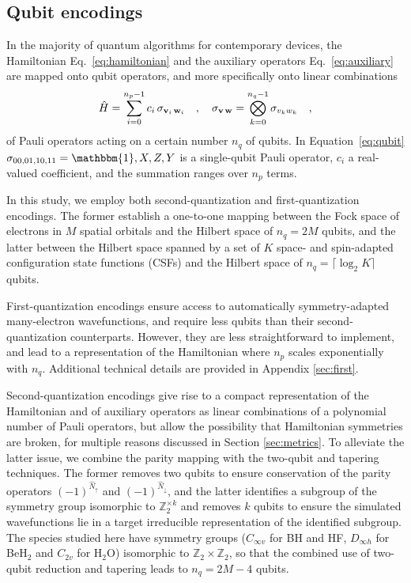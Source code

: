 \documentclass[aps,pra,twocolumn]{revtex4-2}
\newcommand{\vett}[1]{{\bf{#1}}}
\begin{document}
\subsection{Qubit encodings}

In the majority of quantum algorithms for contemporary devices, the Hamiltonian Eq.~\eqref{eq:hamiltonian} and the auxiliary operators Eq.~\eqref{eq:auxiliary} are mapped onto qubit operators,
and more specifically onto linear combinations 
\begin{equation}
\label{eq:qubit}
\hat{H} = \sum_{i=0}^{n_p-1} c_i \, \sigma_{\vett{v}_i \, \vett{w}_i} 
\quad,\quad
\sigma_{\vett{v} \, \vett{w}} = \bigotimes_{k=0}^{n_q-1} \sigma_{v_k w_k} 
\quad,
\end{equation}
of Pauli operators acting on a certain number $n_q$ of qubits. In Equation~\eqref{eq:qubit} $\sigma_{00,01,10,11} = \mathbbm{1},X,Z,Y$ is a single-qubit Pauli operator, 
$c_i$ a real-valued coefficient, and the summation ranges over $n_p$ terms.

In this study, we employ both second-quantization and first-quantization encodings.
The former establish a one-to-one mapping between the Fock space of electrons in $M$ spatial orbitals and the Hilbert space of $n_q = 2M$ qubits,
and the latter between the Hilbert space spanned by a set of $K$ space- and spin-adapted configuration state functions (CSFs) and the Hilbert space of $n_q = \lceil \log_2 K \rceil$ qubits.

First-quantization encodings ensure access to automatically symmetry-adapted many-electron wavefunctions, and require less qubits than their second-quantization counterparts.
However, they are less straightforward to implement, and lead to a representation of the Hamiltonian where $n_p$ scales exponentially with $n_q$.
Additional technical details are provided in Appendix \ref{sec:first}.

Second-quantization encodings give rise to a compact representation of the Hamiltonian and of auxiliary operators as linear combinations of a polynomial number of Pauli operators,
but allow the possibility that Hamiltonian symmetries are broken, for multiple reasons discussed in Section \ref{sec:metrics}.
To alleviate the latter issue, we combine the parity mapping with the two-qubit and tapering techniques. The former removes two qubits to ensure conservation of the parity operators
$(-1)^{\hat{N}_\uparrow}$ and $(-1)^{\hat{N}_\downarrow}$, and the latter identifies a subgroup of the symmetry group isomorphic to $\mathbb{Z}_2^{\times k}$ and removes $k$ qubits
to ensure the simulated wavefunctions lie in a target irreducible representation of the identified subgroup. The species studied here have symmetry groups 
($C_{\infty v}$ for BH and HF, $D_{\infty h}$ for BeH$_2$ and $C_{2v}$ for H$_2$O) isomorphic to $\mathbb{Z}_2 \times \mathbb{Z}_2$, so that the combined use of two-qubit reduction
and tapering leads to $n_q = 2M-4$ qubits.
\end{document}
